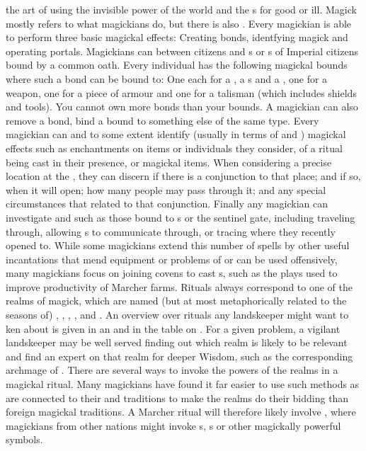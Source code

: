  the art of using the invisible power of the world and the s for good or ill. Magick mostly refers to what magickians do, but there is also . \localpar Every magickian is able to perform three basic magickal effects: Creating bonds, identfying magick and operating portals. \localpar Magickians can  between citizens and s or s of Imperial citizens bound by a common oath. Every individual has the following magickal bounds where such a bond can be bound to: One each for a , a s and a , one for a weapon, one for a piece of armour and one for a talisman (which includes shields and tools). You cannot own more bonds than your bounds. A magickian can also remove a bond, bind a bound to something else of the same type. \localpar Every magickian can  and to some extent identify (usually in terms of  and ) magickal effects such as enchantments on items or individuals they consider, of a ritual being cast in their presence, or magickal items. When considering a precise location at the , they can discern if there is a conjunction to that place; and if so, when it will open; how many people may pass through it; and any special circumstances that related to that conjunction. \localpar Finally any magickian can investigate and  such as those bound to s or the sentinel gate, including traveling through, allowing s to communicate through, or tracing where they recently opened to. \localpar While some magickians extend this number of spells by other useful incantations that mend equipment or problems of  or can be used offensively, many magickians focus on joining covens to cast s, such as the  plays used to improve productivity of Marcher farms. Rituals always correspond to one of the realms of magick, which are named (but at most metaphorically related to the seasons of) , , , ,  and . An overview over rituals any landskeeper might want to ken about is given in an  and in the table on . For a given problem, a vigilant landskeeper may be well served finding out which realm is likely to be relevant and find an expert on that realm for deeper Wisdom, such as the corresponding archmage of . \localpar There are several ways to invoke the powers of the realms in a magickal ritual. Many magickians have found it far easier to use such methods as are connected to their  and traditions to make the realms do their bidding than foreign magickal traditions. A Marcher ritual will therefore likely involve , where magickians from other nations might invoke s, s or other magickally powerful symbols.
